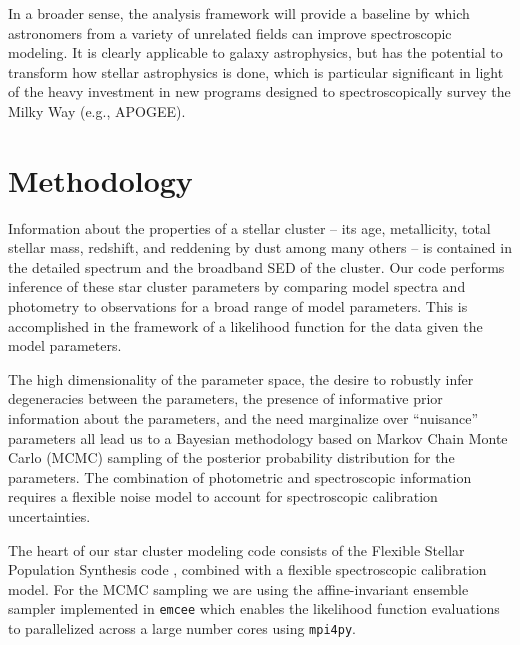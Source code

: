 \documentclass[11pt,preprint]{aastex}
\begin{document}
In a broader sense, the analysis framework will provide a baseline by which astronomers from a variety of unrelated fields can improve spectroscopic modeling.  It is clearly applicable to galaxy astrophysics, but has the potential to transform how stellar astrophysics is done, which is particular significant in light of the heavy investment in new programs designed to spectroscopically survey the Milky Way (e.g., APOGEE).


\section{Methodology}

Information about the properties of a stellar cluster -- its age, metallicity, total stellar mass, redshift, and reddening by dust among many others -- is contained in the detailed spectrum and the broadband SED of the cluster. 
Our code performs inference of these star cluster parameters by comparing model spectra and photometry to observations for a broad range of model parameters.  
This is accomplished in the framework of a likelihood function for the data given the model parameters.  

The high dimensionality of the parameter space, the desire to robustly infer degeneracies between the parameters, the presence of informative prior information about the parameters, and the need marginalize over ``nuisance'' parameters all lead us to a Bayesian methodology based on Markov Chain Monte Carlo (MCMC) sampling of the posterior probability distribution for the parameters. 
The combination of photometric and spectroscopic information requires a flexible noise model to account for spectroscopic calibration uncertainties.

The heart of our star cluster modeling code consists of the Flexible Stellar Population Synthesis code \citep[FSPS][]{fsps}, combined with a flexible spectroscopic calibration model.  
For the MCMC sampling we are using the affine-invariant ensemble sampler implemented in \texttt{emcee} \citep{emcee} which enables the likelihood function evaluations to parallelized across a large number cores using \texttt{mpi4py}. 
\end{document}
